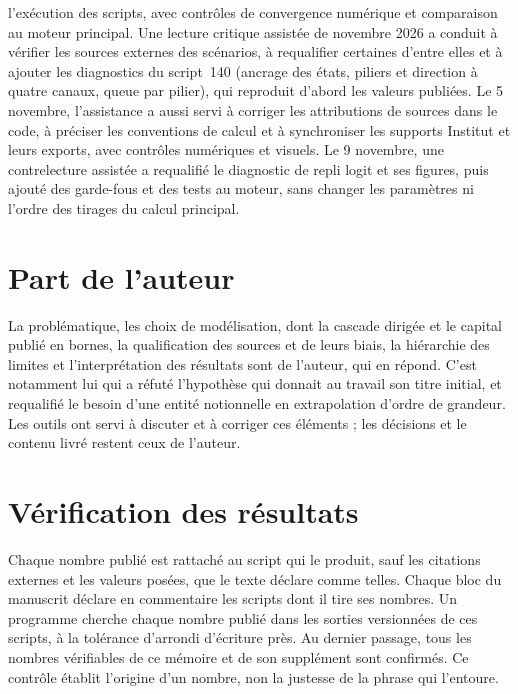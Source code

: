 \begin{enumerate}[itemsep=0pt,topsep=3pt]
      l'exécution des scripts, avec contrôles de convergence numérique et comparaison au moteur principal. Une lecture critique assistée de novembre 2026 a conduit à vérifier les sources externes des scénarios, à requalifier certaines d'entre elles et à ajouter les diagnostics du script~140 (ancrage des états, piliers et direction à quatre canaux, queue par pilier), qui reproduit d'abord les valeurs publiées. Le 5 novembre, l'assistance a aussi servi à corriger les attributions de sources dans le code, à préciser les conventions de calcul et à synchroniser les supports Institut et leurs exports, avec contrôles numériques et visuels.
      Le 9 novembre, une contrelecture assistée a requalifié le diagnostic de repli logit et
      ses figures, puis ajouté des garde-fous et des tests au moteur, sans changer les paramètres
      ni l'ordre des tirages du calcul principal.
\end{enumerate}

\section{Part de l'auteur}

La problématique, les choix de modélisation, dont la cascade dirigée et le capital publié en
bornes, la qualification des sources et de leurs biais, la hiérarchie des limites et
l'interprétation des résultats sont de l'auteur, qui en répond. C'est notamment lui qui a réfuté
l'hypothèse qui donnait au travail son titre initial, et requalifié le besoin d'une entité
notionnelle en extrapolation d'ordre de grandeur. Les outils ont servi à discuter et à corriger ces
éléments ; les décisions et le contenu livré restent ceux de l'auteur.

\section{Vérification des résultats}

Chaque nombre publié est rattaché au script qui le produit, sauf les citations externes et les
valeurs posées, que le texte déclare comme telles. Chaque bloc du manuscrit déclare en commentaire
les scripts dont il tire ses nombres. Un programme cherche chaque nombre publié dans les sorties
versionnées de ces scripts, à la tolérance d'arrondi d'écriture près. Au dernier passage, tous les
nombres vérifiables de ce mémoire et de son supplément sont confirmés. Ce contrôle établit l'origine
d'un nombre, non la justesse de la phrase qui l'entoure.

